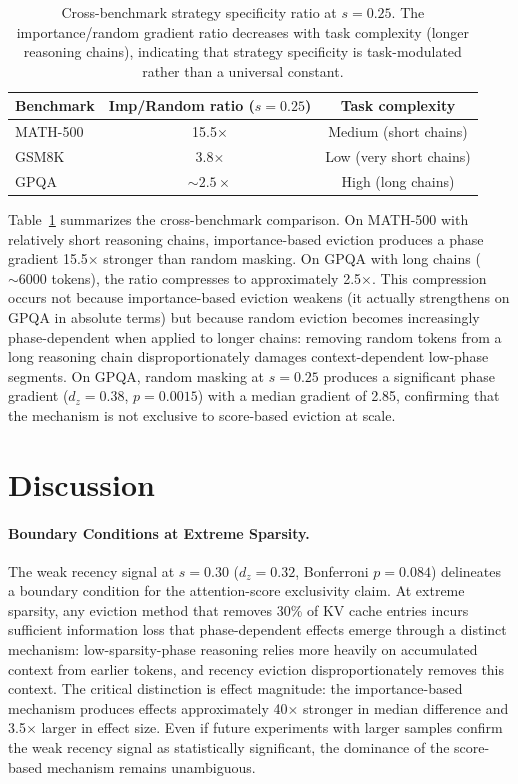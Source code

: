 \documentclass[11pt,a4paper]{article}
\begin{document}
\begin{table}[t]
\centering
\caption{Cross-benchmark strategy specificity ratio at $s=0.25$. The importance/random gradient ratio decreases with task complexity (longer reasoning chains), indicating that strategy specificity is task-modulated rather than a universal constant.}
\label{tab:specificity}
\begin{tabular}{lcc}
\toprule
Benchmark & Imp/Random ratio ($s=0.25$) & Task complexity \\
\midrule
MATH-500 & 15.5$\times$ & Medium (short chains) \\
GSM8K & 3.8$\times$ & Low (very short chains) \\
GPQA & ${\sim}2.5\times$ & High (long chains) \\
\bottomrule
\end{tabular}
\end{table}

Table~\ref{tab:specificity} summarizes the cross-benchmark comparison. On MATH-500 with relatively short reasoning chains, importance-based eviction produces a phase gradient 15.5$\times$ stronger than random masking. On GPQA with long chains (${\sim}6000$ tokens), the ratio compresses to approximately 2.5$\times$. This compression occurs not because importance-based eviction weakens (it actually strengthens on GPQA in absolute terms) but because random eviction becomes increasingly phase-dependent when applied to longer chains: removing random tokens from a long reasoning chain disproportionately damages context-dependent low-phase segments. On GPQA, random masking at $s=0.25$ produces a significant phase gradient ($d_z=0.38$, $p=0.0015$) with a median gradient of 2.85, confirming that the mechanism is not exclusive to score-based eviction at scale.

\section{Discussion}

\paragraph{Boundary Conditions at Extreme Sparsity.} The weak recency signal at $s=0.30$ ($d_z=0.32$, Bonferroni $p=0.084$) delineates a boundary condition for the attention-score exclusivity claim. At extreme sparsity, any eviction method that removes 30\% of KV cache entries incurs sufficient information loss that phase-dependent effects emerge through a distinct mechanism: low-sparsity-phase reasoning relies more heavily on accumulated context from earlier tokens, and recency eviction disproportionately removes this context. The critical distinction is effect magnitude: the importance-based mechanism produces effects approximately 40$\times$ stronger in median difference and 3.5$\times$ larger in effect size. Even if future experiments with larger samples confirm the weak recency signal as statistically significant, the dominance of the score-based mechanism remains unambiguous.
\end{document}

